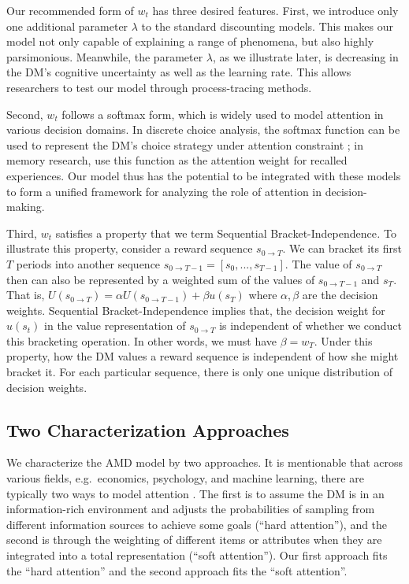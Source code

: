\documentclass[
  12pt,
]{article}
\begin{document}
Our recommended form of \(w_t\) has three desired features. First, we
introduce only one additional parameter \(\lambda\) to the standard
discounting models. This makes our model not only capable of explaining
a range of phenomena, but also highly parsimonious. Meanwhile, the
parameter \(\lambda\), as we illustrate later, is decreasing in the DM's
cognitive uncertainty as well as the learning rate. This allows
researchers to test our model through process-tracing methods.

Second, \(w_t\) follows a softmax form, which is widely used to model
attention in various decision domains. In discrete choice analysis, the
softmax function can be used to represent the DM's choice strategy under
attention constraint \citep{matvejka2015rational}; in memory research,
\citet{bordalo2020memory} use this function as the attention weight for
recalled experiences. Our model thus has the potential to be integrated
with these models to form a unified framework for analyzing the role of
attention in decision-making.

Third, \(w_t\) satisfies a property that we term Sequential
Bracket-Independence\emph{.} To illustrate this property, consider a
reward sequence \(s_{0\rightarrow T}\). We can bracket its first \(T\)
periods into another sequence
\(s_{0\rightarrow T-1}=[s_0,...,s_{T-1}]\). The value of
\(s_{0\rightarrow T}\) then can also be represented by a weighted sum of
the values of \(s_{0\rightarrow T-1}\) and \(s_T\). That is,
\(U(s_{0\rightarrow T})=\alpha U(s_{0\rightarrow T-1})+\beta u(s_T)\)
where \(\alpha,\beta\) are the decision weights. Sequential
Bracket-Independence implies that, the decision weight for \(u(s_t)\) in
the value representation of \(s_{0\rightarrow T}\) is independent of
whether we conduct this bracketing operation. In other words, we must
have \(\beta = w_T\). Under this property, how the DM values a reward
sequence is independent of how she might bracket it. For each particular
sequence, there is only one unique distribution of decision weights.

\hypertarget{two-characterization-approaches}{%
\subsection{Two Characterization
Approaches}\label{two-characterization-approaches}}

We characterize the AMD model by two approaches. It is mentionable that
across various fields, e.g.~economics, psychology, and machine learning,
there are typically two ways to model attention
\citep{xu2015show, gabaix2019behavioral, lindsay2020attention}. The
first is to assume the DM is in an information-rich environment and
adjusts the probabilities of sampling from different information sources
to achieve some goals (``hard attention''), and the second is through
the weighting of different items or attributes when they are integrated
into a total representation (``soft attention''). Our first approach
fits the ``hard attention'' and the second approach fits the ``soft
attention''.
\end{document}
